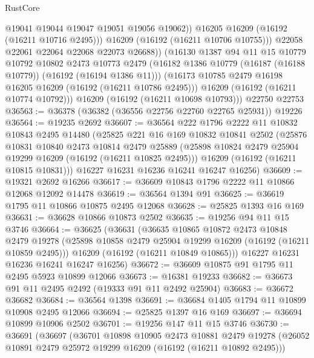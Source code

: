 \begin{lexlean}{RustCore}
\begin{coremodule}
                  @19041
                  @19044
                  @19047
                  @19051
                  @19056
                  @19062))
              @16205
              @16209
              (@16192 (@16211 @10716 @2495)))
            @16209
            (@16192 (@16211 @10706 @10755)))
          @22058
          @22061
          @22064
          @22068
          @22073
          @26688))
      (@16130
        @1387
        @94
        @11
        @15
        @10779
        @10792
        @10802
        @2473
        @10773
        @2479
        (@16182 @1386 @10779 (@16187 (@16188 @10779)) (@16192 (@16194 @1386 @11)))
        (@16173 @10785 @2479 @16198 @16205 @16209 (@16192 (@16211 @10786 @2495)))
        @16209
        (@16192 (@16211 @10774 @10792)))
      @16209
      (@16192 (@16211 @10698 @10793)))
    @22750
    @22753
@36563 := @36378 (@36382 (@36556 @22756 @22760 @22765 @25931)) @19226
@36564 := @19235 @2692
@36607 := @36564
    @222
    @1796
    @2222
    @11
    @10832
    @10843
    @2495
    @14480
    (@25825
      @221
      @16
      @169
      @10832
      @10841
      @2502
      (@25876
        @10831
        @10840
        @2473
        @10814
        @2479
        @25889
        (@25898 @10824 @2479 @25904 @19299 @16209 (@16192 (@16211 @10825 @2495)))
        @16209
        (@16192 (@16211 @10815 @10831)))
      @16227
      @16231
      @16236
      @16241
      @16247
      @16256)
@36609 := @19321 @2692 @16266
@36617 := @36609 @10843 @1796 @2222 @11 @10866 @12068 @12092 @14478
@36619 := @36564 @1394 @91
@36625 := @36619 @1795 @11 @10866 @10875 @2495 @12068
@36628 := @25825 @1393 @16 @169
@36631 := @36628 @10866 @10873 @2502
@36635 := @19256 @94 @11 @15 @3746
@36664 := @36625
    (@36631
      (@36635
        @10865
        @10872
        @2473
        @10848
        @2479
        @19278
        (@25898 @10858 @2479 @25904 @19299 @16209 (@16192 (@16211 @10859 @2495)))
        @16209
        (@16192 (@16211 @10849 @10865)))
      @16227
      @16231
      @16236
      @16241
      @16247
      @16256)
@36672 := @36609 @10875 @91 @1795 @11 @2495 @5923 @10899 @12066
@36673 := @16381 @19233
@36682 := @36673 @91 @11 @2495 @2492 (@19333 @91 @11 @2492 @25904)
@36683 := @36672 @36682
@36684 := @36564 @1398
@36691 := @36684 @1405 @1794 @11 @10899 @10908 @2495 @12066
@36694 := @25825 @1397 @16 @169
@36697 := @36694 @10899 @10906 @2502
@36701 := @19256 @147 @11 @15 @3746
@36730 := @36691
    (@36697
      (@36701
        @10898
        @10905
        @2473
        @10881
        @2479
        @19278
        (@26052 @10891 @2479 @25972 @19299 @16209 (@16192 (@16211 @10892 @2495)))

\end{coremodule}
\end{lexlean}
